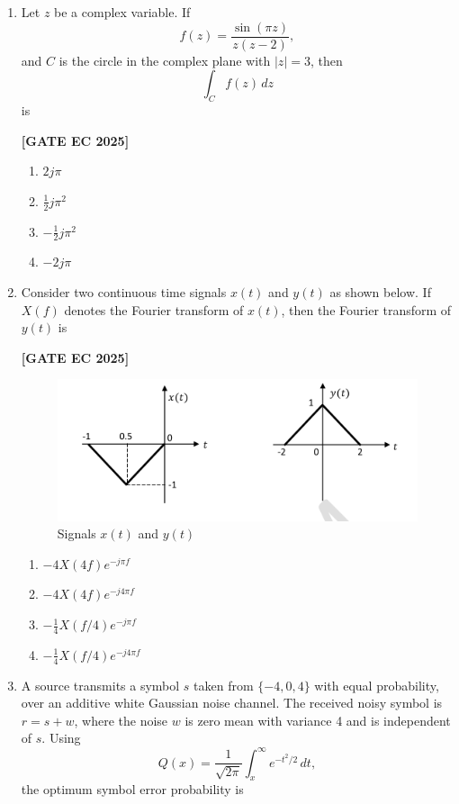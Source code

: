 \documentclass[12pt]{article}
\begin{document}
\begin{enumerate}[leftmargin=1.5em, label=\textbf{Q.\arabic*}., itemsep=2em]
\item Let $z$ be a complex variable. If
\[
f(z) = \frac{\sin(\pi z)}{z(z-2)},
\]
and $C$ is the circle in the complex plane with $|z|=3$, then
\[
\int_C f(z)\,dz
\]
is

\noindent \textbf{[GATE EC 2025]}
\begin{multicols}{2}
\begin{enumerate}
    \item $2j\pi$
    \item $\tfrac{1}{2}j\pi^2$
    \item $-\tfrac{1}{2}j\pi^2$
    \item $-2j\pi$
\end{enumerate}
\end{multicols}

\item Consider two continuous time signals $x(t)$ and $y(t)$ as shown below. If $X(f)$ denotes the Fourier transform of $x(t)$, then the Fourier transform of $y(t)$ is

\noindent \textbf{[GATE EC 2025]}
\begin{figure}[H]\centering
\includegraphics[width=0.65\columnwidth]{figs/q44.png}
\caption{Signals $x(t)$ and $y(t)$}
\label{fig:q44}
\end{figure}
\begin{multicols}{2}
\begin{enumerate}
    \item $-4X(4f)e^{-j\pi f}$
    \item $-4X(4f)e^{-j4\pi f}$
    \item $-\tfrac{1}{4}X(f/4)e^{-j\pi f}$
    \item $-\tfrac{1}{4}X(f/4)e^{-j4\pi f}$
\end{enumerate}
\end{multicols}

\item A source transmits a symbol $s$ taken from $\{-4,0,4\}$ with equal probability, over an additive white Gaussian noise channel. The received noisy symbol is $r = s+w$, where the noise $w$ is zero mean with variance 4 and is independent of $s$. Using
\[
Q(x) = \frac{1}{\sqrt{2\pi}} \int_x^\infty e^{-t^2/2}\,dt,
\]
the optimum symbol error probability is


\end{enumerate}
\end{document}
